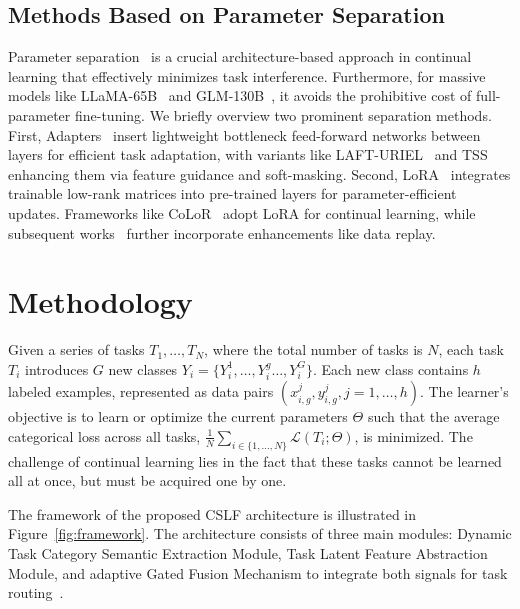 \documentclass[11pt]{article}
\begin{document}
\subsection{Methods Based on Parameter Separation}
Parameter separation~\cite{wang2023orthogonal,wistuba2023continual} is a crucial architecture-based approach in continual learning that effectively minimizes task interference. Furthermore, for massive models like LLaMA-65B~\cite{touvron2023llama} and GLM-130B~\cite{zeng2022glm}, it avoids the prohibitive cost of full-parameter fine-tuning. We briefly overview two prominent separation methods. First, Adapters~\cite{houlsby2019parameter} insert lightweight bottleneck feed-forward networks between layers for efficient task adaptation, with variants like LAFT-URIEL~\cite{badola2022parameter} and TSS~\cite{ke2023sub} enhancing them via feature guidance and soft-masking. Second, LoRA~\cite{lora} integrates trainable low-rank matrices into pre-trained layers for parameter-efficient updates. Frameworks like CoLoR~\cite{wistuba2023continual} adopt LoRA for continual learning, while subsequent works~\cite{i_lora,inf_lora} further incorporate enhancements like data replay.

\section{Methodology}
Given a series of  tasks $ T_1, \ldots, T_N $, where the total number of tasks is $ N $, each task  $ T_i $ introduces $ G $ new classes $ Y_i = \{Y_i^1, \ldots,Y_i^g \ldots,Y_i^G\} $. Each new class contains $ h $ labeled examples, represented as data pairs $ (x_{i,g}^{j}, y_{i,g}^{j},j=1, \ldots, h) $.  The learner's objective is to learn or optimize the current parameters $ \Theta $ such that the average categorical loss across all tasks, $ \frac{1}{N} \sum_{i \in \{1, \ldots, N\}} \mathcal{L}(T_i; \Theta) $, is minimized. The challenge of continual learning lies in the fact that these tasks cannot be learned all at once, but must be acquired one by one.

The framework of the proposed CSLF architecture is illustrated in Figure~\ref{fig:framework}. The architecture consists of three main modules: Dynamic Task Category Semantic Extraction Module, Task Latent Feature Abstraction Module, and adaptive Gated Fusion Mechanism to integrate both signals for task routing~\cite{attention,bahdanau2014neural}.
\end{document}
